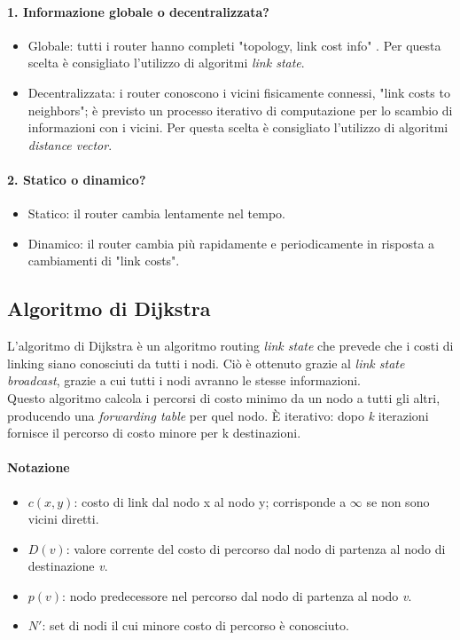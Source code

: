\paragraph{1. Informazione globale o decentralizzata?}
\begin{itemize}
	\item Globale: tutti i router hanno completi "topology, link cost info"%
	. Per questa scelta è consigliato l'utilizzo di algoritmi \textit{link state}.
	\item Decentralizzata: i router conoscono i vicini fisicamente connessi, "link costs to neighbors"; è previsto un processo iterativo di computazione per lo scambio di informazioni con i vicini. Per questa scelta è consigliato l'utilizzo di algoritmi \textit{distance vector}.	
\end{itemize}
\paragraph{2. Statico o dinamico?}
\begin{itemize}
	\item Statico: il router cambia lentamente nel tempo.
	\item Dinamico: il router cambia più rapidamente e periodicamente in risposta a cambiamenti di "link costs".
\end{itemize}

\subsection{Algoritmo di Dijkstra}
L'algoritmo di Dijkstra è un algoritmo routing \textit{link state} che prevede che i costi di linking siano conosciuti da tutti i nodi. Ciò è ottenuto grazie al \textit{link state broadcast}, grazie a cui tutti i nodi avranno le stesse informazioni.\\
Questo algoritmo calcola i percorsi di costo minimo da un nodo a tutti gli altri, producendo una \textit{forwarding table} per quel nodo. È iterativo: dopo \textit{k} iterazioni fornisce il percorso di costo minore per k destinazioni.
\paragraph{Notazione}
\begin{itemize}
	\item $ c(x,y) $: costo di link dal nodo x al nodo y; corrisponde a $ \infty $ se non sono vicini diretti.
	\item  $ D(v) $: valore corrente del costo di percorso dal nodo di partenza al nodo di destinazione \textit{v}.
	\item  $ p(v) $: nodo predecessore nel percorso dal nodo di partenza al nodo \textit{v}.
	\item  $ N' $: set di nodi il cui minore costo di percorso è conosciuto.
\end{itemize}

